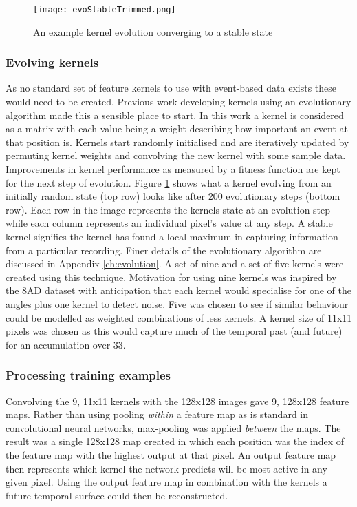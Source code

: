 \begin{figure}[h]
    \centering
    \texttt{[image: evoStableTrimmed.png]}
    \caption{An example kernel evolution converging to a stable state}
    \label{fig:evoStable}
\end{figure}

\subsubsection{Evolving kernels}
As no standard set of feature kernels to use with event-based data exists these would need to be created.
Previous work developing kernels using an evolutionary algorithm made this a sensible place to start.
In this work a kernel is considered as a matrix with each value being a weight describing how important an event at that position is.
Kernels start randomly initialised and are iteratively updated by permuting kernel weights and convolving the new kernel with some sample data.
Improvements in kernel performance as measured by a fitness function are kept for the next step of evolution.
Figure \ref{fig:evoStable} shows what a kernel evolving from an initially random state (top row) looks like after 200 evolutionary steps (bottom row).
Each row in the image represents the kernels state at an evolution step while each column represents an individual pixel's value at any step. 
A stable kernel signifies the kernel has found a local maximum in capturing information from a particular recording.
Finer details of the evolutionary algorithm are discussed in Appendix \ref{ch:evolution}.
A set of nine and a set of five kernels were created using this technique.
Motivation for using nine kernels was inspired by the 8AD dataset with anticipation that each kernel would specialise for one of the angles plus one kernel to detect noise.
Five was chosen to see if similar behaviour could be modelled as weighted combinations of less kernels.
A kernel size of 11x11 pixels was chosen as this would capture much of the temporal past (and future) for an accumulation over 33\ms.



\subsubsection{Processing training examples}
Convolving the 9, 11x11 kernels with the 128x128 images gave 9, 128x128 feature maps.
Rather than using pooling \textit{within} a feature map as is standard in convolutional neural networks, max-pooling was applied \textit{between} the maps. 
The result was a single 128x128 map created in which each position was the index of the feature map with the highest output at that pixel.
An output feature map then represents which kernel the network predicts will be most active in any given pixel.
Using the output feature map in combination with the kernels a future temporal surface could then be reconstructed. 


